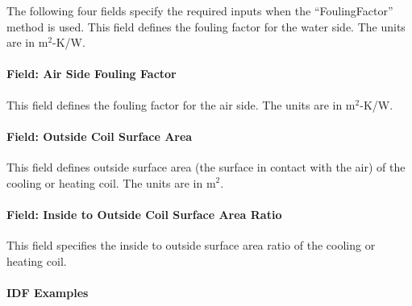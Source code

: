 The following four fields specify the required inputs when the ``FoulingFactor'' method is used. This field defines the fouling factor for the water side. The units are in m\(^{2}\)-K/W.

\paragraph{Field: Air Side Fouling Factor}\label{field-air-side-fouling-factor}

This field defines the fouling factor for the air side. The units are in m\(^{2}\)-K/W.

\paragraph{Field: Outside Coil Surface Area}\label{field-outside-coil-surface-area}

This field defines outside surface area (the surface in contact with the air) of the cooling or heating coil. The units are in m\(^{2}\).

\paragraph{Field: Inside to Outside Coil Surface Area Ratio}\label{field-inside-to-outside-coil-surface-area-ratio}

This field specifies the inside to outside surface area ratio of the cooling or heating coil.

\paragraph{IDF Examples}

